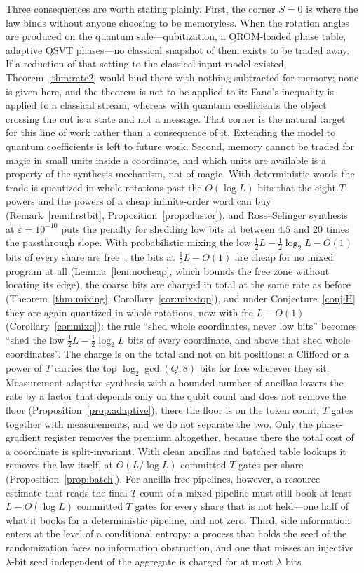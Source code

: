 \documentclass[aps,prx,twocolumn,superscriptaddress,nofootinbib,longbibliography]{revtex4-2}
\theoremstyle{plain}
\theoremstyle{definition}
\theoremstyle{remark}
\begin{document}
Three consequences are worth stating plainly. First, the corner $S=0$ is where the law binds without anyone choosing to be memoryless. When the rotation angles are produced on the quantum side---qubitization, a QROM-loaded phase table, adaptive QSVT phases---no classical snapshot of them exists to be traded away. If a reduction of that setting to the classical-input model existed, Theorem~\ref{thm:rate2} would bind there with nothing subtracted for memory; none is given here, and the theorem is not to be applied to it: Fano's inequality is applied to a classical stream, whereas with quantum coefficients the object crossing the cut is a state and not a message. That corner is the natural target for this line of work rather than a consequence of it. Extending the model to quantum coefficients is left to future work. Second, memory cannot be traded for magic in small units inside a coordinate, and which units are available is a property of the synthesis mechanism, not of magic. With deterministic words the trade is quantized in whole rotations past the $O(\log L)$ bits that the eight $T$-powers and the powers of a cheap infinite-order word can buy (Remark~\ref{rem:firstbit}, Proposition~\ref{prop:cluster}), and Ross--Selinger synthesis at $\varepsilon=10^{-10}$ puts the penalty for shedding low bits at between $4.5$ and $20$ times the passthrough slope. With probabilistic mixing the low $\tfrac12L-\tfrac12\log_2L-O(1)$ bits of every share are free~\cite{Bothe}, the bits at $\tfrac12L-O(1)$ are cheap for no mixed program at all (Lemma~\ref{lem:nocheap}, which bounds the free zone without locating its edge), the coarse bits are charged in total at the same rate as before (Theorem~\ref{thm:mixing}, Corollary~\ref{cor:mixstop}), and under Conjecture~\ref{conj:H} they are again quantized in whole rotations, now with fee $L-O(1)$ (Corollary~\ref{cor:mixq}): the rule ``shed whole coordinates, never low bits'' becomes ``shed the low $\tfrac12L-\tfrac12\log_2L$ bits of every coordinate, and above that shed whole coordinates''. The charge is on the total and not on bit positions: a Clifford or a power of $T$ carries the top $\log_2\gcd(Q,8)$ bits for free wherever they sit. Measurement-adaptive synthesis with a bounded number of ancillas lowers the rate by a factor that depends only on the qubit count and does not remove the floor (Proposition~\ref{prop:adaptive}); there the floor is on the token count, $T$ gates together with measurements, and we do not separate the two. Only the phase-gradient register removes the premium altogether, because there the total cost of a coordinate is split-invariant. With clean ancillas and batched table lookups it removes the law itself, at $O(L/\log L)$ committed $T$ gates per share (Proposition~\ref{prop:batch}). For ancilla-free pipelines, however, a resource estimate that reads the final $T$-count of a mixed pipeline must still book at least $L-O(\log L)$ committed $T$ gates for every share that is not held---one half of what it books for a deterministic pipeline, and not zero. Third, side information enters at the level of a conditional entropy: a process that holds the seed of the randomization faces no information obstruction, and one that misses an injective $\lambda$-bit seed independent of the aggregate is charged for at most $\lambda$ bits 
\end{document}
